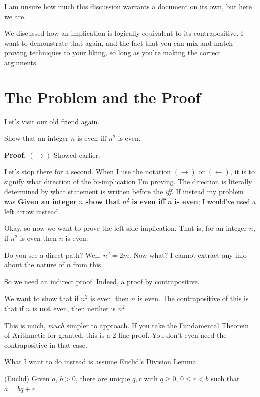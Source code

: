 

I am unsure how much this discussion warrants a document on its own, but here we are.

We discussed how an implication is logically equivalent to its contrapositive. I want to demonstrate that again, and the fact that you can mix and match proving techniques to your liking, so long as you're making the correct arguments.

\section*{The Problem and the Proof}
Let's visit our old friend again.

\begin{SNP}{\prb}Show that an integer $n$ is even iff $n^2$ is even.
\end{SNP}
\begin{smrg}
    \textbf{Proof.} $(\rightarrow)$ Showed earlier.
\end{smrg}
Let's stop there for a second. When I use the notation $(\rightarrow)$ or $(\leftarrow)$, it is to signify what direction of the bi-implication I'm proving. The direction is literally determined by what statement is written before the \textit{iff}. If instead my problem was \textbf{Given an integer} $n$ \textbf{show that} $n^2$ \textbf{is even iff} $n$ \textbf{is even}; I would've used a left arrow instead.

Okay, so now we want to prove the left side implication. That is, for an integer $n$, if $n^2$ is even then $n$ is even.

Do you see a direct path? Well, $n^2 = 2m$. Now what? I cannot extract any info about the nature of $n$ from this.

So we need an indirect proof. Indeed, a proof by contrapositive.

We want to show that if $n^2$ is even, then $n$ is even. The contrapositive of this is that if $n$ is \textbf{not} even, then neither is $n^2$.

This is much, \textit{much} simpler to approach. If you take the Fundamental Theorem of Arithmetic for granted, this is a 2 line proof. You don't even need the contrapositive in that case.

What I want to do instead is assume Euclid's Division Lemma.

\begin{SNP}{\lm}(Euclid) Given $a$, $b > 0$, there are unique $q, r$ with $q \geq 0$, $0 \le r < b$ such that $a = bq + r$.
\end{SNP}


